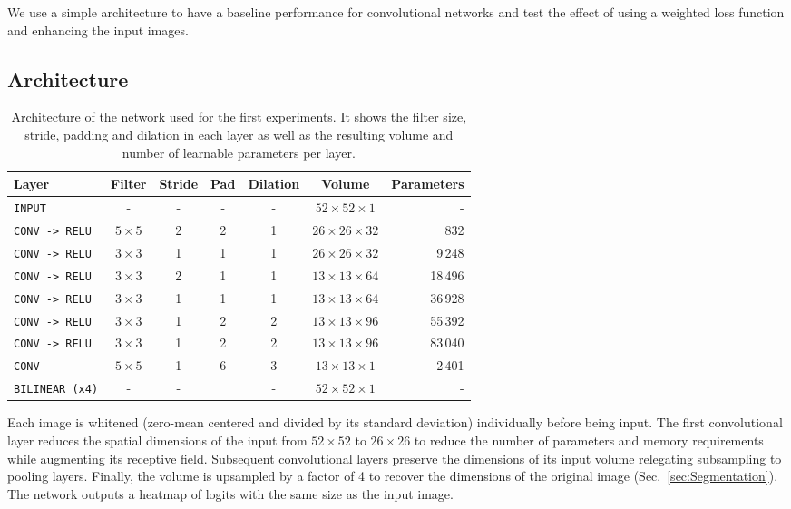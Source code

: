 We use a simple architecture to have a baseline performance for convolutional networks and test the effect of using a weighted loss function and enhancing the input images.

\subsection{Architecture}
\begin{table}[h!]
	\centering
	\begin{tabular}{lcccccr}
	\hline
	\textbf{Layer} & \textbf{Filter} & \textbf{Stride} & \textbf{Pad} & \textbf{Dilation} & \textbf{Volume} & \textbf{Parameters} \\
	\hline
	\texttt{INPUT}	&- & -	& - & - & $52 \times 52 \times 1$ & -\\
	\texttt{CONV -> RELU}	& $5 \times 5$ & 2 & 2 & 1 & $26 \times 26 \times 32$ & 832\\
	\texttt{CONV -> RELU}	& $3 \times 3$ & 1 & 1 & 1 & $26 \times 26 \times 32$ & 9\,248\\
	\texttt{CONV -> RELU}	& $3 \times 3$ & 2 & 1 & 1 & $13 \times 13 \times 64$ & 18\,496\\
	\texttt{CONV -> RELU}	& $3 \times 3$ & 1 & 1 & 1 & $13 \times 13 \times 64$ & 36\,928\\
	\texttt{CONV -> RELU}	& $3 \times 3$ & 1 & 2 & 2 & $13 \times 13 \times 96$ & 55\,392\\
	\texttt{CONV -> RELU}	& $3 \times 3$ & 1 & 2 & 2 & $13 \times 13 \times 96$ & 83\,040\\
	\texttt{CONV}			& $5 \times 5$ & 1 & 6 & 3 & $13 \times 13 \times 1$ & 2\,401\\
	\texttt{BILINEAR (x4)}	& - & - && - & $52 \times 52 \times 1$ & -\\
	\hline
	\end{tabular}
	\caption[Convolutional network architecture for Experiment 1]{Architecture of the network used for the first experiments. It shows the filter size, stride, padding and dilation in each layer as well as the resulting volume and number of learnable parameters per layer.}
	\label{tab:convNetArchitecture1}
\end{table} %

Each image is whitened (zero-mean centered and divided by its standard deviation) individually before being input. 
The first convolutional layer reduces the spatial dimensions of the input from $52 \times 52$ to $26 \times 26$ to reduce the number of parameters and memory requirements while augmenting its receptive field. Subsequent convolutional layers preserve the dimensions of its input volume relegating subsampling to pooling layers. 
Finally, the volume is upsampled by a factor of 4 to recover the dimensions of the original image (Sec.~\ref{sec:Segmentation}). The network outputs a heatmap of logits with the same size as the input image.

